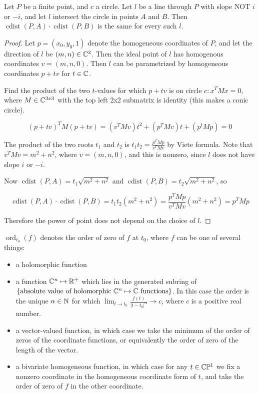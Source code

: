 \documentclass[a4paper]{article}
\newcommand{\ord}{\operatorname{ord}}
\begin{document}
\begin{lemma}
    Let $P$ be a finite point, and $c$ a circle. Let $l$ be a line through $P$ with slope NOT $i$ or $-i$, and let $l$ intersect the circle in points $A$ and $B$. Then
    $\operatorname{cdist}(P,A)\cdot \operatorname{cdist}(P,B)$
    is the same for every such $l$.
\end{lemma}
\begin{proof}
    Let $p=(x_0,y_0,1)$ denote the homogeneous coordinates of $P$, and let the direction of $l$ be $(m,n)\in \mathbb{C}^2$. Then the ideal point of $l$ has homogenous coordinates $v=(m,n,0)$. Then $l$ can be parametrized by homogeneous coordinates $p+tv$ for $t\in \mathbb{C}$.

    Find the product of the two $t$-values for which $p+tv$ is on circle $c:x^TMx=0$, where $M\in \mathbb{C}^{3x3}$ with the top left 2x2 submatrix is identity (this makes a conic circle).

    $$(p+tv)^TM(p+tv)=(v^TMv)t^2+(p^TMv)t+(p^tMp)=0$$

    The product of the two roots $t_1$ and $t_2$ is $t_1t_2=\frac{p^TMp}{v^TMv}$ by Viete formula. Note that $v^TMv=m^2+n^2$, where $v=(m,n,0)$, and this is nonzero, since $l$ does not have slope $i$ or $-i$.

    Now $\operatorname{cdist}(P,A)=t_1\sqrt{m^2+n^2}$ and $\operatorname{cdist}(P,B)=t_2\sqrt{m^2+n^2}$, so

    $$\operatorname{cdist}(P,A)\cdot \operatorname{cdist}(P,B)=t_1t_2(m^2+n^2)=\frac{p^TMp}{v^TMv}(m^2+n^2)=p^TMp$$

Therefore the power of point does not depend on the choice of $l$.
\end{proof}

$\ord_{t_0}(f)$ denotes the order of zero of $f$ at $t_0$, where $f$ can be one of several things:
\begin{itemize}
    \item a holomorphic function
    \item a function $\mathbb{C}^n \mapsto \mathbb{R}^+$ which lies in the generated subring of $\{\text{absolute value of holomorphic }\mathbb{C}^n \mapsto \mathbb{C} \text{ functions}\}$. In this case the order is the unique $\alpha \in \mathbb{N}$ for which $\lim_{t\to t_0}\frac{f(t)}{|t-t_0|^\alpha}\to c$, where $c$ is a positive real number.
    \item a vector-valued function, in which case we take the minimum of the order of zeros of the coordinate functions, or equivalently the order of zero of the length of the vector.
    \item a bivariate homogeneous function, in which case for any $t\in \mathbb{C}\mathbb{P}^1$ we fix a nonzero coordinate in the homogeneous coordinate form of $t$, and take the order of zero of $f$ in the other coordinate.
\end{itemize}
\end{document}
